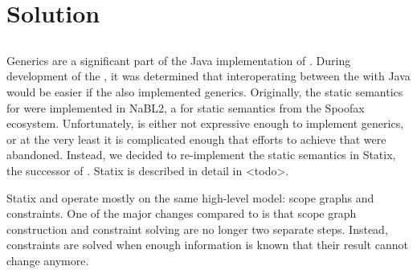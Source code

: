 \chapter{\label{chap:solution}Solution}


\section{\label{sec:solution__statix}}
Generics are a significant part of the Java implementation of .
During development of the  , it was determined that interoperating between the   with Java would be easier if the  also implemented generics.
Originally, the static semantics for  were implemented in NaBL2, a  for static semantics from the Spoofax ecosystem.
Unfortunately,  is either not expressive enough to implement generics, or at the very least it is complicated enough that efforts to achieve that were abandoned. 
Instead, we decided to re-implement  the static semantics in Statix, the successor of .
Statix is described in detail in <todo>.

Statix and  operate mostly on the same high-level model: scope graphs and constraints.
One of the major changes compared to  is that scope graph construction and constraint solving are no longer two separate steps.
Instead, constraints are solved when enough information is known that their result cannot change anymore.

